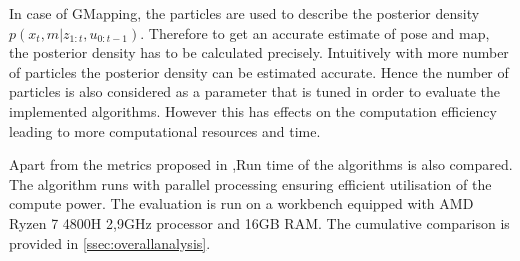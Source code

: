 \par
In case of GMapping, the particles are used to describe the posterior density $p(x_t, m | z_{1:t}, u_{0:t-1})$. Therefore to get an accurate estimate of pose and map, the posterior density has to be calculated precisely. Intuitively with more number of particles the posterior density can be estimated accurate. Hence the number of particles is also considered as a parameter that is tuned in order to evaluate the implemented algorithms. However this has effects on the computation efficiency leading to more computational resources and time.
\par
Apart from the metrics proposed in \cite{kuemmerle09auro},Run time of the algorithms is also compared. The algorithm runs with parallel processing ensuring efficient utilisation of the compute power. The evaluation is run on a workbench equipped with AMD Ryzen 7 4800H 2,9GHz processor and 16GB RAM. The cumulative comparison is provided in \ref{ssec:overallanalysis}.

